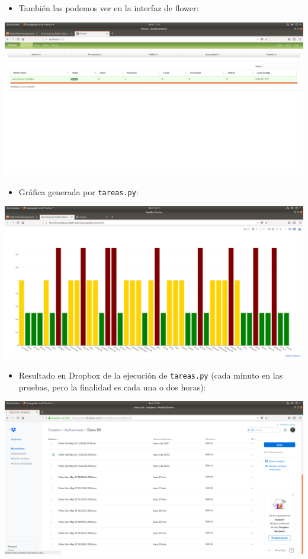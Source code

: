 \documentclass[12pt,letterpaper]{article}
\begin{document}
\begin{itemize}
	\item También las podemos ver en la interfaz de flower:
\end{itemize}
\begin{center}
	\includegraphics[scale=0.24]{4.png}
\end{center}

\newpage
\begin{itemize}
	\item Gráfica generada por \texttt{tareas.py}:
\end{itemize}
\begin{center}
	\includegraphics[scale=0.24]{5.png}
\end{center}

\begin{itemize}
	\item Resultado en Dropbox de la ejecución de \texttt{tareas.py} (cada minuto en las pruebas, pero la finalidad es cada una o dos horas):
\end{itemize}
\begin{center}
	\includegraphics[scale=0.24]{8.png}
\end{center}
\end{document}
